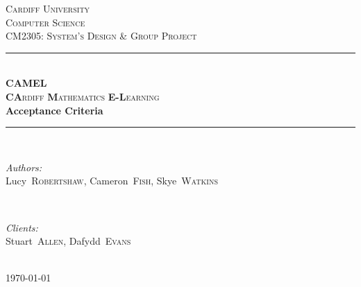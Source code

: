 \documentclass[12pt]{article}
\begin{document}
	\begin{titlepage}
		\newcommand{\HRule}{\rule{\linewidth}{0.5mm}}

		\center

		\textsc{\LARGE Cardiff University}\\[1.5cm]
		\textsc{\Large Computer Science}\\[0.5cm]
		\textsc{\large CM2305: System's Design \& Group Project}\\[0.5cm]

		\HRule \\[0.4cm]
		\textsc{\Large \textbf{CAMEL}}\\[0.1cm]
		\textsc{\Large \textbf{CA}rdiff \textbf{M}athematics \textbf{E-L}earning}\\[0.7cm]
		{\huge\bfseries Acceptance Criteria}\\[0.4cm]
		\HRule \\[1.5cm]

		\begin{minipage}{0.4\textwidth}
			\begin{flushleft} \large
				\emph{Authors:}\\
				\mbox{Lucy \textsc{Robertshaw}}, \mbox{Cameron \textsc{Fish}}, \mbox{Skye \textsc{Watkins}}
			\end{flushleft}
		\end{minipage}
		~
		\begin{minipage}{0.4\textwidth}
			\begin{flushright} \large
				\emph{Clients:} \\
				\mbox{Stuart \textsc{Allen}}, \mbox{Dafydd \textsc{Evans}}
			\end{flushright}
		\end{minipage}\\[3cm]

		{\large \today}\\[2cm]

		\vfill
	\end{titlepage}


	\tableofcontents

	\newpage
	
\end{document}
